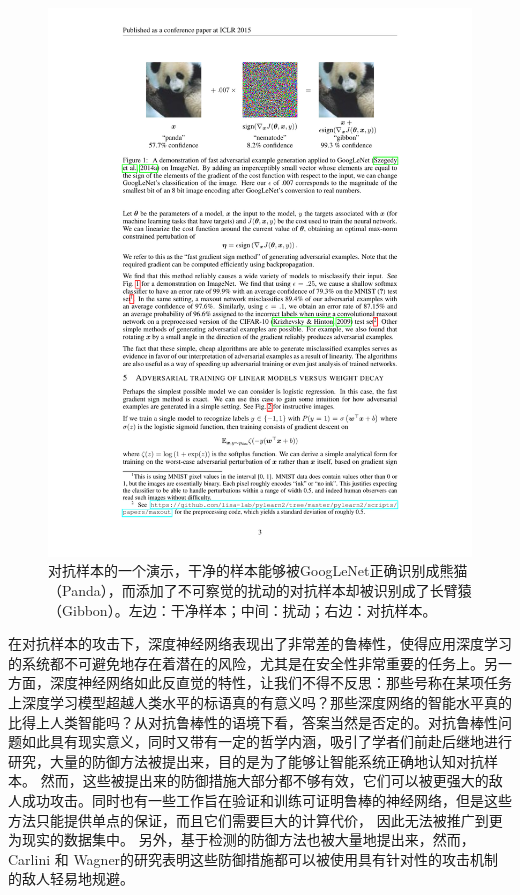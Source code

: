 \begin{figure}[h]
    \centering
    \includegraphics{fig/adversarial_example.pdf}
    \caption{对抗样本的一个演示，干净的样本能够被GoogLeNet\cite{szegedy2015going}正确识别成熊猫（Panda），而添加了不可察觉的扰动的对抗样本却被识别成了长臂猿（Gibbon）。左边：干净样本；中间：扰动；右边：对抗样本。}
    \label{fig:adversarial_example}
\end{figure}

在对抗样本的攻击下，深度神经网络表现出了非常差的鲁棒性，使得应用深度学习的系统都不可避免地存在着潜在的风险，尤其是在安全性非常重要的任务上。另一方面，深度神经网络如此反直觉的特性，让我们不得不反思：那些号称在某项任务上深度学习模型超越人类水平的标语真的有意义吗？那些深度网络的智能水平真的比得上人类智能吗？从对抗鲁棒性的语境下看，答案当然是否定的。对抗鲁棒性问题如此具有现实意义，同时又带有一定的哲学内涵，吸引了学者们前赴后继地进行研究，大量的防御方法被提出来，目的是为了能够让智能系统正确地认知对抗样本\cite{szegedy2013intriguing, gu2014towards, madry2018towards, papernot2016distillation, rozsa2016adversarial, zheng2016improving}。 然而，这些被提出来的防御措施大部分都不够有效，它们可以被更强大的敌人成功攻击\cite{carlini2017towards}。同时也有一些工作旨在验证和训练可证明鲁棒的神经网络，但是这些方法只能提供单点的保证，而且它们需要巨大的计算代价， 因此无法被推广到更为现实的数据集中\cite{raghunathan2018certified, pmlr-v80-wong18a, wong2018scaling}。 另外，基于检测的防御方法也被大量地提出来\cite{grosse2017statistical, gong2017adversarial, metzen2017detecting, li2017adversarial, feinman2017detecting}，然而， Carlini 和 Wagner的研究\cite{carlini2017adversarial}表明这些防御措施都可以被使用具有针对性的攻击机制的敌人轻易地规避。

